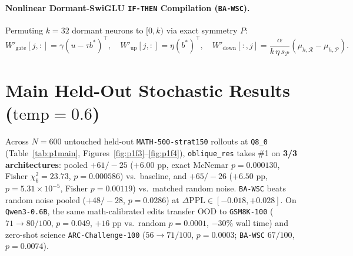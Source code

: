 \documentclass[11pt,letterpaper]{article}
\begin{document}
\paragraph{Nonlinear Dormant-SwiGLU \texttt{IF-THEN} Compilation (\texttt{BA-WSC}).} Permuting $k=32$ dormant neurons to $[0,k)$ via exact symmetry $P$:
\begin{equation}
W'_{\text{gate}}[j,:] = \gamma(u - \tau b^*)^\top, \quad
W'_{\text{up}}[j,:] = \eta (b^*)^\top, \quad
W'_{\text{down}}[:,j] = \frac{\alpha}{k\,\eta\,s_{\mathcal{P}}}(\mu_{h,\mathcal{R}} - \mu_{h,\mathcal{P}}).
\end{equation}

\section{Main Held-Out Stochastic Results ($\text{temp}=0.6$)}
Across $N=600$ untouched held-out \texttt{MATH-500-strat150} rollouts at \texttt{Q8\_0} (Table~\ref{tab:p1main}, Figures~\ref{fig:p1f3}--\ref{fig:p1f4}), \texttt{oblique\_res} takes \#1 on \textbf{3/3 architectures}: pooled $+61/-25$ ($+6.00\text{ pp}$, exact McNemar $p=0.000130$, Fisher $\chi^2_6=23.73$, $p=0.000586$) vs.\ baseline, and $+65/-26$ ($+6.50\text{ pp}$, $p=5.31\times 10^{-5}$, Fisher $p=0.00119$) vs.\ matched random noise. \texttt{BA-WSC} beats random noise pooled ($+48/-28$, $p=0.0286$) at $\Delta\text{PPL}\in[-0.018,+0.028]$. On \texttt{Qwen3-0.6B}, the same math-calibrated edits transfer OOD to \texttt{GSM8K-100} ($71 \to 80/100$, $p=0.049$, $+16\text{ pp}$ vs.\ random $p=0.0001$, $-30\%$ wall time) and zero-shot science \texttt{ARC-Challenge-100} ($56 \to 71/100$, $p=0.0003$; \texttt{BA-WSC} $67/100$, $p=0.0074$).
\end{document}
